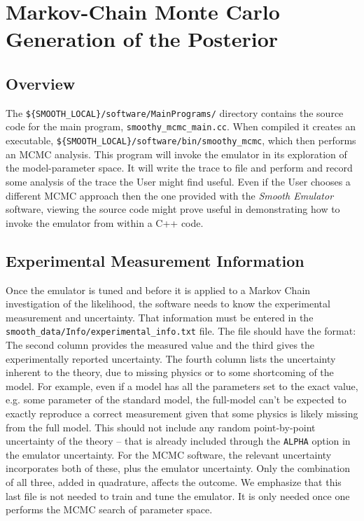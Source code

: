 \documentclass[UserManual.tex]{subfiles}
\begin{document}
\section{Markov-Chain Monte Carlo Generation of the Posterior}\label{sec:mcmc}

\subsection{Overview}
The {\tt \$\{SMOOTH\_LOCAL\}/software/MainPrograms/} directory contains the source code for the main program, {\tt smoothy\_mcmc\_main.cc}. When compiled it creates an executable, {\tt \$\{SMOOTH\_LOCAL\}/software/bin/smoothy\_mcmc}, which then performs an MCMC analysis. This program will invoke the emulator in its exploration of the model-parameter space. It will write the trace to file and perform and record some analysis of the trace the User might find useful. Even if the User chooses a different MCMC approach then the one provided with the {\it Smooth Emulator} software, viewing the source code might prove useful in demonstrating how to invoke the emulator from within a C++ code. 

\subsection{Experimental Measurement Information}
Once the emulator is tuned and before it is applied to a Markov Chain investigation of the likelihood, the software needs to know the experimental measurement and uncertainty. That information must be entered in the {\tt smooth\_data/Info/experimental\_info.txt} file. The file should have the format:
\vspace*{-8pt}{\tt \begin{Verbatim}[commandchars=\\\{\}]
 observable_name_1  value_1    exp_uncertainty_1   theory_uncertainty_1
 observable_name_2  value_2    exp_uncertainty_2   theory_uncertainty_2
 observable_name_3  value_3    exp_uncertainty_3   theory_uncertainty_3
 observable_name_4  value_4    exp_uncertainty_4   theory_uncertainty_4
 .
\end{Verbatim}
}\vspace*{-8pt}
The second column provides the measured value and the third gives the experimentally reported uncertainty. The fourth column lists the uncertainty inherent to the theory, due to missing physics or to some shortcoming of the model. For example, even if a model has all the parameters set to the exact value, e.g. some parameter of the standard model, the full-model can't be expected to exactly reproduce a correct measurement given that some physics is likely missing from the full model. This should not include any random point-by-point uncertainty of the theory -- that is already included through the {\tt ALPHA} option in the emulator uncertainty. For the MCMC software, the relevant uncertainty incorporates both of these, plus the emulator uncertainty. Only the combination of all three, added in quadrature, affects the outcome. We emphasize that this last file is not needed to train and tune the emulator. It is only needed once one performs the MCMC search of parameter space. 
\end{document}
